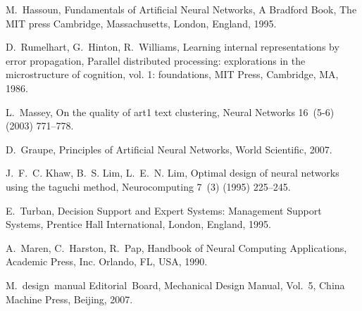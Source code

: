 \documentclass{elsarticle}
\begin{document}
\begin{thebibliography}{10}
M.~Hassoun, Fundamentals of Artificial Neural Networks, A Bradford Book, The
  MIT press Cambridge, Massachusetts, London, England, 1995.

D.~Rumelhart, G.~Hinton, R.~Williams, Learning internal representations by
  error propagation, Parallel distributed processing: explorations in the
  microstructure of cognition, vol. 1: foundations, MIT Press, Cambridge, MA,
  1986.

L.~Massey,
  {On the quality of art1 text clustering}, Neural
  Networks 16~(5-6) (2003) 771--778.


D.~Graupe, Principles of Artificial Neural Networks, World Scientific, 2007.

J.~F.~C. Khaw, B.~S. Lim, L.~E.~N. Lim,
 {Optimal design of neural networks using the taguchi
  method}, Neurocomputing 7~(3) (1995) 225--245.


E.~Turban, Decision Support and Expert Systems: Management Support Systems,
  Prentice Hall International, London, England, 1995.

A.~Maren, C.~Harston, R.~Pap, Handbook of Neural Computing Applications,
  Academic Press, Inc. Orlando, FL, USA, 1990.

M.~design~manual Editorial~Board, Mechanical Design Manual, Vol.~5, China
  Machine Press, Beijing, 2007.

\end{thebibliography}
\end{document}
